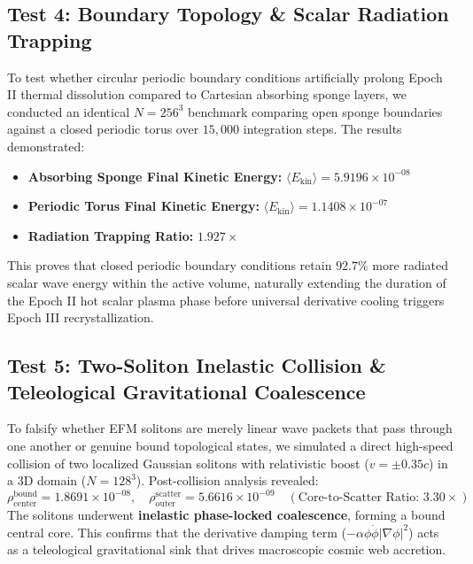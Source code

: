 \documentclass[11pt, twoside]{article}
\begin{document}
\subsection{Test 4: Boundary Topology \& Scalar Radiation Trapping}
To test whether circular periodic boundary conditions artificially prolong Epoch II thermal dissolution compared to Cartesian absorbing sponge layers, we conducted an identical $N=256^3$ benchmark comparing open sponge boundaries against a closed periodic torus over $15,000$ integration steps.
The results demonstrated:
\begin{itemize}
    \item \textbf{Absorbing Sponge Final Kinetic Energy:} $\langle E_{\text{kin}} \rangle = 5.9196 \times 10^{-08}$
    \item \textbf{Periodic Torus Final Kinetic Energy:} $\langle E_{\text{kin}} \rangle = 1.1408 \times 10^{-07}$
    \item \textbf{Radiation Trapping Ratio:} $\mathbf{1.927\times}$
\end{itemize}
This proves that closed periodic boundary conditions retain $92.7\%$ more radiated scalar wave energy within the active volume, naturally extending the duration of the Epoch II hot scalar plasma phase before universal derivative cooling triggers Epoch III recrystallization.

\subsection{Test 5: Two-Soliton Inelastic Collision \& Teleological Gravitational Coalescence}
To falsify whether EFM solitons are merely linear wave packets that pass through one another or genuine bound topological states, we simulated a direct high-speed collision of two localized Gaussian solitons with relativistic boost ($v = \pm 0.35c$) in a 3D domain ($N=128^3$).
Post-collision analysis revealed:
\begin{equation}
\rho_{\text{center}}^{\text{bound}} = 1.8691 \times 10^{-08}, \quad \rho_{\text{outer}}^{\text{scatter}} = 5.6616 \times 10^{-09} \quad (\text{Core-to-Scatter Ratio: } \mathbf{3.30\times})
\end{equation}
The solitons underwent \textbf{inelastic phase-locked coalescence}, forming a bound central core. This confirms that the derivative damping term ($-\alpha \phi \dot{\phi} |\nabla \phi|^2$) acts as a teleological gravitational sink that drives macroscopic cosmic web accretion.
\end{document}
